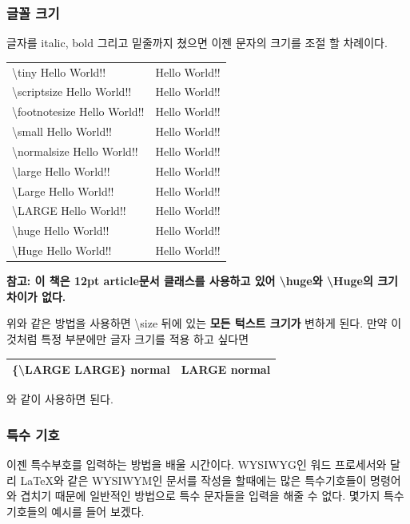 \documentclass[12pt]{article}
\begin{document}
	\subsubsection{글꼴 크기}
	글자를 italic, bold 그리고 밑줄까지 쳤으면 이젠 문자의 크기를 조절 할 차례이다.\newline
	
	\begin{tabularx}{\textwidth \onehalfspacing}{|X|X|}
		\hline
		\textbackslash tiny Hello World!! & \tiny Hello World!!\\
		\textbackslash scriptsize Hello World!! & \scriptsize Hello World!!\\
		\textbackslash footnotesize Hello World!! & \footnotesize Hello World!!\\
		\textbackslash small Hello World!! & \small Hello World!!\\
		\textbackslash normalsize Hello World!! & \normalsize Hello World!!\\
		\textbackslash large Hello World!! & \large Hello World!!\\
		\textbackslash Large Hello World!! & \Large Hello World!!\\
		\textbackslash LARGE Hello World!! & \LARGE Hello World!!\\
		\textbackslash huge Hello World!! & \huge Hello World!!\\
		\textbackslash Huge Hello World!! & \Huge Hello World!!\\
		\hline
	\end{tabularx}
	\newline
	\newline
	\textbf{참고: 이 책은 12pt article문서 클래스를 사용하고 있어 \textbackslash huge와 \textbackslash Huge의 크기 차이가 없다.}
	
	위와 같은 방법을 사용하면 \textbackslash size 뒤에 있는 {\bf 모든 턱스트 크기가} 변하게 된다. 만약 {\large 이것처럼} 특정 부분에만 글자 크기를 적용 하고 싶다면 \newline
	
	\begin{tabularx}{\textwidth \doublespacing}{ |X|X| }
		\hline
		\{\textbackslash LARGE LARGE\} normal & {\LARGE LARGE} normal\\
		\hline
	\end{tabularx}
	\newline
	\newline
	와 같이 사용하면 된다.
	\subsubsection{특수 기호}
	이젠 특수부호를 입력하는 방법을 배울 시간이다. WYSIWYG인 워드 프로세서와 달리 \LaTeX 와 같은 WYSIWYM인 문서를 작성을 할때에는 많은 특수기호들이 명령어와 겹치기 때문에 일반적인 방법으로 특수 문자들을 입력을 해줄 수 없다. 몇가지 특수기호들의 예시를 들어 보겠다.\newline
	
\end{document}
